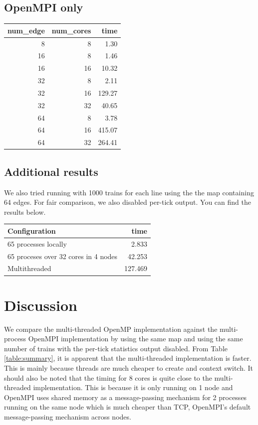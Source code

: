 \documentclass[a4paper,12pt]{article}
\begin{document}
\subsection{OpenMPI only}
\begin{center}
	\begin{tabular}{r r | r}
		num\_edge & num\_cores & time   \\
		\hline
		8         & 8          & 1.30   \\
		\hline
		16        & 8          & 1.46   \\
		16        & 16         & 10.32  \\
		\hline
		32        & 8          & 2.11   \\
		32        & 16         & 129.27 \\
		32        & 32         & 40.65  \\
		\hline
		64        & 8          & 3.78   \\
		64        & 16         & 415.07 \\
		64        & 32         & 264.41 \\
	\end{tabular}
\end{center}

\subsection{Additional results}
We also tried running with 1000 trains for each line using the the map containing 64 edges. For fair comparison, we also disabled per-tick output. You can find the results below.

\begin{center}
	\begin{tabular}{l | r}
		Configuration                        & time    \\ \hline
		65 processes locally                 & 2.833   \\
		65 proceses over 32 cores in 4 nodes & 42.253  \\
		Multithreaded                        & 127.469 \\
	\end{tabular}
	\label{table:additional}
\end{center}

\section{Discussion}
We compare the multi-threaded OpenMP implementation against the multi-process OpenMPI implementation by using the same map and using the same number of trains with the per-tick statistics output disabled. From Table \ref{table:summary}, it is apparent that the multi-threaded implementation is faster. This is mainly because threads are much cheaper to create and context switch. It should also be noted that the timing for 8 cores is quite close to the multi-threaded implementation. This is because it is only running on 1 node and OpenMPI uses shared memory as a message-passing mechanism for 2 processes running on the same node which is much cheaper than TCP, OpenMPI's default message-passing mechanism across nodes.
\end{document}
